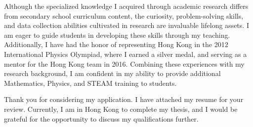 \documentclass[11pt, a4paper]{awesome-cv}
\begin{document}
\begin{cvletter}
Although the specialized knowledge I acquired through academic research differs from secondary school curriculum content, the curiosity, problem-solving skills, and data collection abilities cultivated in research are invaluable lifelong assets. I am eager to guide students in developing these skills through my teaching. Additionally, I have had the honor of representing Hong Kong in the 2012 International Physics Olympiad, where I earned a silver medal, and serving as a mentor for the Hong Kong team in 2016. Combining these experiences with my research background, I am confident in my ability to provide additional Mathematics, Physics, and STEAM training to students.

Thank you for considering my application. I have attached my resume for your review. Currently, I am in Hong Kong to complete my thesis, and I would be grateful for the opportunity to discuss my qualifications further.

\end{cvletter}


\makeletterclosing
\end{document}
